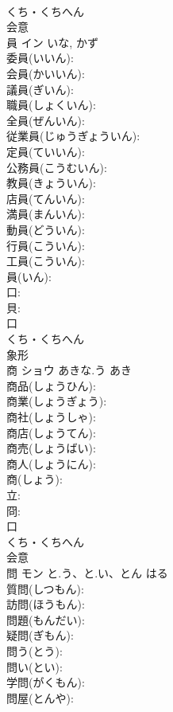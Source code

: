 \documentclass[8pt]{extreport}
\begin{document}
\begin{CJK}{UTF8}{min}
\\	くち・くちへん	
\\	会意 
\\	員	イン		いな, かず	
\\	委員(いいん): 
\\	会員(かいいん): 
\\	議員(ぎいん): 
\\	職員(しょくいん): 
\\	全員(ぜんいん): 
\\	従業員(じゅうぎょういん): 
\\	定員(ていいん): 
\\	公務員(こうむいん): 
\\	教員(きょういん): 
\\	店員(てんいん): 
\\	満員(まんいん): 
\\	動員(どういん): 
\\	行員(こういん): 
\\	工員(こういん): 
\\	員(いん): 
\\	口: 
\\	貝: 
\\	口	
\\	くち・くちへん	
\\	象形 
\\	商	ショウ	あきな.う	あき	
\\	商品(しょうひん): 
\\	商業(しょうぎょう): 
\\	商社(しょうしゃ): 
\\	商店(しょうてん): 
\\	商売(しょうばい): 
\\	商人(しょうにん): 
\\	商(しょう): 
\\	立: 
\\	冏: 
\\	口	
\\	くち・くちへん	
\\	会意 
\\	問	モン	と.う、と.い、とん	はる	
\\	質問(しつもん): 
\\	訪問(ほうもん): 
\\	問題(もんだい): 
\\	疑問(ぎもん): 
\\	問う(とう): 
\\	問い(とい): 
\\	学問(がくもん): 
\\	問屋(とんや): 

\end{CJK}
\end{document}
